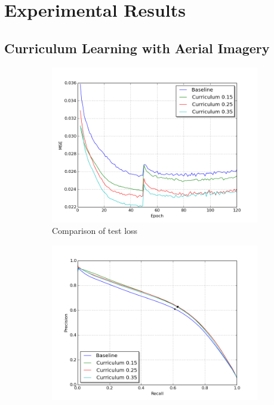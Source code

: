 \section{Experimental Results}
\label{sec:experimentalResults}

\subsection{Curriculum Learning with Aerial Imagery}
\label{sec:results_curriculum_learning_aerial_imagery}

\begin{figure}[!ht]
\begin{subfigure}{0.48\textwidth}
\includegraphics[width=\linewidth]{figs/E1/E1-lc.png}
\caption{Comparison of test loss} \label{fig:E1_curr_norway_loss}
\end{subfigure}
\hspace*{\fill} %
\begin{subfigure}{0.48\textwidth}
\includegraphics[width=\linewidth]{figs/E1/E1-pr.png}

\end{subfigure}
\end{figure}

